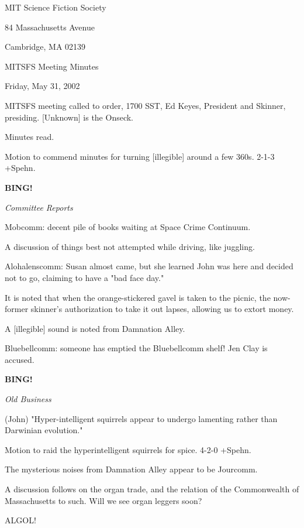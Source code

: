 \documentclass[12pt]{article}
\newcommand{\bing}{{\bf BING!} }
\newcommand{\goto}[1]{\bing \vskip 12pt \centerline{{\em{#1}}}}
\begin{document}
\begin{center}

MIT Science Fiction Society 

84 Massachusetts Avenue

Cambridge, MA 02139

\vspace{12pt}

MITSFS Meeting Minutes 

Friday, May 31, 2002

\end{center}
 
\vspace{18pt}

\setlength{\parskip}{6pt}

\noindent
MITSFS meeting called to order, 1700 SST, Ed Keyes, President and Skinner, presiding. [Unknown] is the Onseck.

Minutes read.

Motion to commend minutes for turning [illegible] around a few 360s. 2-1-3 +Spehn.

\goto{Committee Reports}

Mobcomm: decent pile of books waiting at Space Crime Continuum.

A discussion of things best not attempted while driving, like juggling.

Alohalenscomm: Susan almost came, but she learned John was here and decided not to go, claiming to have a "bad face day."

It is noted that when the orange-stickered gavel is taken to the picnic, the now-former skinner's authorization to take it out lapses, allowing us to extort money.

A [illegible] sound is noted from Damnation Alley.

Bluebellcomm: someone has emptied the Bluebellcomm shelf! Jen Clay is accused.

\goto{Old Business}

(John) "Hyper-intelligent squirrels appear to undergo lamenting rather than Darwinian evolution."

Motion to raid the hyperintelligent squirrels for spice. 4-2-0 +Spehn.

The mysterious noises from Damnation Alley appear to be Jourcomm.

A discussion follows on the organ trade, and the relation of the Commonwealth of Massachusetts to such. Will we see organ leggers soon?

ALGOL!
\end{document}

